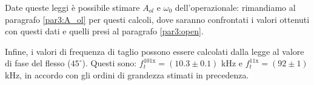 Date queste leggi è possibile stimare $A_{ol}$ e $\omega_0$ dell'operazionale: rimandiamo al paragrafo \ref{par3:A_ol} per questi calcoli, dove saranno confrontati i valori ottenuti con questi dati e quelli presi al paragrafo \ref{par3:open}.

Infine, i valori di frequenza di taglio possono essere calcolati dalla legge al valore di fase del flesso ($45^{\circ}$). Questi sono: $f_t^{101\mathrm{x}} = (10.3 \pm 0.1)$ \si{\kHz} e $f_t^{11\mathrm{x}} = (92 \pm 1)$ \si{\kHz}, in accordo con gli ordini di grandezza stimati in precedenza.
